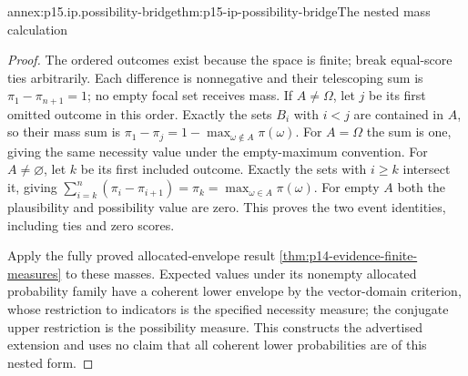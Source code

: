 \begin{annexitem}{annex:p15.ip.possibility-bridge}{thm:p15-ip-possibility-bridge}{The nested mass calculation}
\begin{proof}
The ordered outcomes exist because the space is finite; break equal-score
ties arbitrarily. Each difference is nonnegative and their telescoping
sum is \(\pi_1-\pi_{n+1}=1\); no empty focal set receives mass.
If \(A\ne\Omega\), let \(j\) be its first omitted outcome in this
order. Exactly the sets \(B_i\) with \(i<j\) are contained in
\(A\), so their mass sum is
\(\pi_1-\pi_j=1-\max_{\omega\notin A}\pi(\omega)\).
For \(A=\Omega\) the sum is one, giving the same necessity value
under the empty-maximum convention. For \(A\ne\varnothing\),
let \(k\) be its first included outcome. Exactly the sets with
\(i\geq k\) intersect it, giving
\(\sum_{i=k}^n(\pi_i-\pi_{i+1})=\pi_k=
\max_{\omega\in A}\pi(\omega)\). For empty \(A\) both
the plausibility and possibility value are zero. This proves the two
event identities, including ties and zero scores.

Apply the fully proved allocated-envelope result
\cref{thm:p14-evidence-finite-measures} to these masses. Expected values
under its nonempty allocated probability family have a coherent lower
envelope by the vector-domain criterion, whose restriction to indicators
is the specified necessity measure; the conjugate upper restriction is
the possibility measure. This constructs the advertised extension and
uses no claim that all coherent lower probabilities are of this nested
form.
\end{proof}
\end{annexitem}

